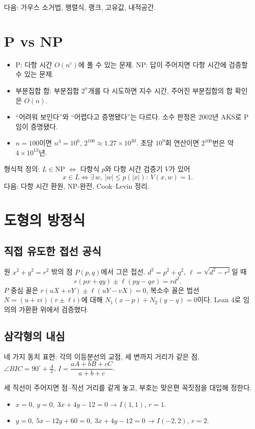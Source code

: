 \documentclass[11pt]{article}
\begin{document}
다음: 가우스 소거법, 행렬식, 랭크, 고유값, 내적공간.

\section{P vs NP}
\begin{itemize}[nosep]
\item P: 다항 시간 $O(n^c)$에 풀 수 있는 문제. NP: 답이 주어지면 다항 시간에 검증할 수 있는 문제.
\item 부분집합 합: 부분집합 $2^n$개를 다 시도하면 지수 시간, 주어진 부분집합의 합 확인은 $O(n)$.
\item ``어려워 보인다''와 ``어렵다고 증명됐다''는 다르다. 소수 판정은 2002년 AKS로 P임이 증명됐다.
\item $n=100$이면 $n^3=10^6$, $2^{100}\approx1.27\times10^{30}$. 초당 $10^9$회 연산이면 $2^{100}$번은 약 $4\times10^{13}$년.
\end{itemize}
형식적 정의: $L\in\mathrm{NP}$ $\iff$ 다항식 $p$와 다항 시간 검증기 $V$가 있어
\[
x\in L\iff \exists\,w,\ |w|\le p(|x|):\ V(x,w)=1.
\]
다음: 다항 시간 환원, NP-완전, Cook–Levin 정리.

\section{도형의 방정식}
\subsection{직접 유도한 접선 공식}
원 $x^2+y^2=r^2$ 밖의 점 $P(p,q)$에서 그은 접선. $d^2=p^2+q^2$, $\ell=\sqrt{d^2-r^2}$일 때
\[
r(px+qy)\pm\ell(py-qx)=rd^2.
\]
$P$ 중심 꼴은 $r(uX+vY)\pm\ell(uY-vX)=0$, 복소수 꼴은 법선 $N=(u+vi)(r\pm\ell i)$에 대해 $N_1(x-p)+N_2(y-q)=0$이다. Lean 4로 임의의 가환환 위에서 검증했다.

\subsection{삼각형의 내심}
네 가지 동치 표현: 각의 이등분선의 교점, 세 변까지 거리가 같은 점, $\angle BIC=90^\circ+\tfrac A2$, $I=\dfrac{aA+bB+cC}{a+b+c}$.

세 직선이 주어지면 점–직선 거리를 같게 놓고, 부호는 맞은편 꼭짓점을 대입해 정한다.
\begin{itemize}[nosep]
\item $x=0,\ y=0,\ 3x+4y-12=0$ → $I(1,1)$, $r=1$.
\item $y=0,\ 5x-12y+60=0,\ 3x+4y-12=0$ → $I(-2,2)$, $r=2$.
\end{itemize}














\end{document}
